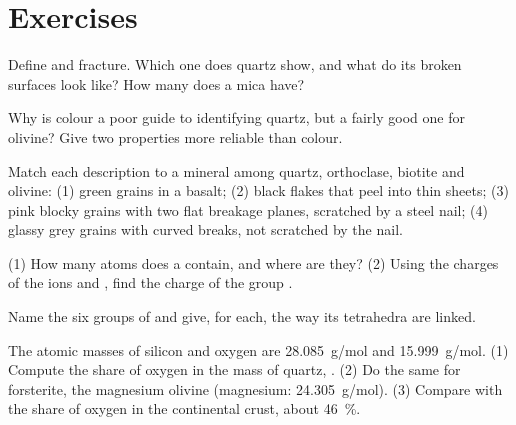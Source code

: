\section{Exercises}

\begin{exercise}[$\star$]\label{exo:g11:minerals:1}
Define  and fracture. Which one does quartz show, and what do its
broken surfaces look like? How many  does a mica have?
\end{exercise}

\begin{exercise}[$\star$]\label{exo:g11:minerals:2}
Why is colour a poor guide to identifying quartz, but a fairly good one for
olivine? Give two properties more reliable than colour.
\end{exercise}

\begin{exercise}[$\star$]\label{exo:g11:minerals:3}
Match each description to a mineral among quartz, orthoclase, biotite and
olivine: (1) green grains in a basalt; (2) black flakes that peel into thin
sheets; (3) pink blocky grains with two flat breakage planes, scratched by a
steel nail; (4) glassy grey grains with curved breaks, not scratched by the
nail.
\end{exercise}

\begin{exercise}[$\star$]\label{exo:g11:minerals:4}
(1) How many atoms does a  contain, and where are
they? (2) Using the charges of the ions  and , find the
charge of the group .
\end{exercise}

\begin{exercise}[$\star$]\label{exo:g11:minerals:5}
Name the six groups of  and give, for each, the way
its tetrahedra are linked.
\end{exercise}

\begin{exercise}[$\star\star$]\label{exo:g11:minerals:6}
The atomic masses of silicon and oxygen are \qty{28.085}{g/mol} and
\qty{15.999}{g/mol}. (1) Compute the share of oxygen in the mass of quartz,
. (2) Do the same for forsterite, the magnesium olivine
 (magnesium: \qty{24.305}{g/mol}). (3) Compare with the share of
oxygen in the continental crust, about \qty{46}{\percent}.
\end{exercise}

